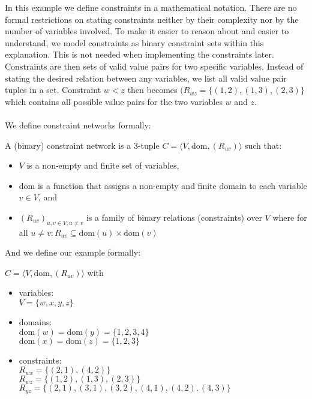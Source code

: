 In this example we define constraints in a mathematical notation. There are no formal restrictions on stating constraints neither by their complexity nor by the number of variables involved. To make it easier to reason about and easier to understand, we model constraints as binary constraint sets within this explanation. This is not needed when implementing the constraints later. Constraints are then sets of valid value pairs for two specific variables. Instead of stating the desired relation between any variables, we list all valid value pair tuples in a set. Constraint $w < z$ then becomes $(R_{wz} = \{(1, 2), (1, 3), (2, 3)\}$ which contains all possible value pairs for the two variables $w$ and $z$. \\ \\

We define constraint networks formally:

\begin{tcolorbox}
	A (binary) constraint network is a 3-tuple $C = \langle V, \text{dom}, (R_{uv})\rangle$ such that:
	\begin{itemize}
		\item $V$ is a non-empty and finite set of variables,
		\item dom is a function that assigns a non-empty and finite domain to each variable $v \in V$, and
		\item $(R_{uv})_{u,v \in V, u \neq v}$ is a family of binary relations (constraints) over $V$ where for all $u \neq v: R_{uv} \subseteq \text{dom}(u) \times \text{dom}(v)$
	\end{itemize}
\end{tcolorbox}

And we define our example formally:

\begin{tcolorbox}
	$C = \langle V, \text{dom}, (R_{uv})\rangle$ with
	\begin{itemize}
		\item variables: \\
		      $V = \{w, x, y, z\}$
		\item domains: \\
		      $\text{dom}(w) = \text{dom}(y) = \{1, 2, 3, 4\}$ \\
		      $\text{dom}(x) = \text{dom}(z) = \{1, 2, 3\}$
		\item constraints: \\
		      $R_{wx} = \{(2, 1), (4, 2)\}$ \\
		      $R_{wz} = \{(1, 2), (1, 3), (2, 3)\}$ \\
		      $R_{yz} = \{(2, 1), (3, 1), (3, 2), (4, 1), (4, 2), (4, 3)\}$ \\
	\end{itemize}
\end{tcolorbox}

